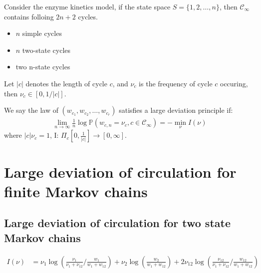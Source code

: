\documentclass[11pt,en,cite=authoryear]{elegantpaper}
\begin{document}
Consider the enzyme kinetics model, if the state space $S=\{1, 2, \dots, n\}$, then $\mathcal{C}_{\infty}$ contains  folloing $2n+2$ cycles. 
\begin{itemize}
    \item $n$ simple cycles
    \item $n$ two-state cycles
    \item two n-state cycles
\end{itemize}
Let $|c|$ denotes the length of cycle $c$, and $\nu_c$ is the frequency of cycle $c$ occuring, then $\nu_c \in [0, 1/|c|]$. 
\begin{definition}
    We say the law of $(w_{c_1}, w_{c_2}, \dots, w_{c_r})$ satisfies a large deviation principle if:
    \begin{align}
        \lim_{n \rightarrow \infty} \frac{1}{n} \log \mathbb{P}(w_{c, n} = \nu_c, c \in \mathcal{C}_{\infty}) = - \min_{\nu} I(\nu)
    \end{align}
    where $|c| \nu_c = 1$, I: $\Pi_{c} [0, \frac{1}{|c|}] \rightarrow [0, \infty]$.
\end{definition}



\section{Large deviation of circulation for finite Markov chains}


\subsection{Large deviation of circulation for two state Markov chains}
\begin{align*}
    I(\nu) &= \nu_{1}\log(\frac{\nu_{1}}{\nu_{1}+\nu_{12}}/\frac{w_{1}}{w_{1}+w_{12}}) + \nu_{2}\log(\frac{w_{2}}{w_{1}+w_{12}}) + 2\nu_{12} \log (\frac{\nu_{12}}{\nu_{1}+\nu_{12}}/\frac{w_{12}}{w_{1}+w_{12}})
\end{align*}
\end{document}

